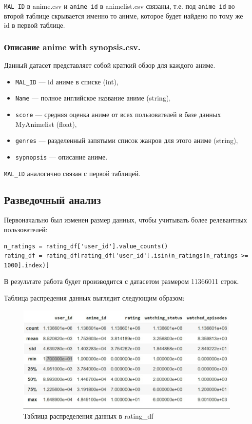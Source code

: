 \documentclass[bachelor, och, diploma]{SCWorks}
\begin{document}
\verb|MAL_ID| в anime.csv и \verb|anime_id| в animelist.csv связаны, т.е. под \verb|anime_id| во второй таблице скрывается именно то аниме, которое будет найдено по 
тому же id в первой таблице.

\subsubsection{Описание anime$\_$with$\_$synopsis.csv.}

Данный датасет представляет собой краткий обзор для каждого аниме.

\begin{itemize}
	\item \verb|MAL_ID| --- id аниме в списке (int),
	\item \verb|Name| --- полное английское название аниме (string),
	\item \verb|score| --- средняя оценка аниме от всех пользователей в базе данных MyAnimelist (float),
	\item \verb|genres| --- разделенный запятыми список жанров для этого аниме (string),
	\item \verb|sypnopsis| --- описание аниме.
\end{itemize}

\verb|MAL_ID| аналогично связан с первой таблицей.

\subsection{Разведочный анализ}

Первоначально был изменен размер данных, чтобы учитывать более релевантных пользователей:

\begin{verbatim}
n_ratings = rating_df['user_id'].value_counts()
rating_df = rating_df[rating_df['user_id'].isin(n_ratings[n_ratings >= 1000].index)]
\end{verbatim}

В результате работа будет производится с датасетом размером 11366011 строк.

Таблица распредения данных выглядит следующим образом:

\begin{figure}[h]

	\centering
	
	\includegraphics[width=0.8\linewidth]{analis1.png}
	
	\caption{Таблица распределения данных в rating\_df}
	
	\label{fig:a1}
	
\end{figure}
\end{document}
